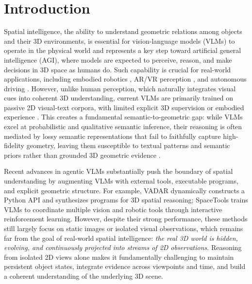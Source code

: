 \section{Introduction}
\label{sec:intro}
Spatial intelligence, the ability to understand geometric relations among objects and their 3D environments, is essential for vision-language models (VLMs) to operate in the physical world and represents a key step toward artificial general intelligence (AGI), where models are expected to perceive, reason, and make decisions in 3D space as humans do. 
% 
Such capability is crucial for real-world applications, including embodied robotics \citep{driess2023palme,brohan2023rt2}, AR/VR perception \citep{newcombe2011kinectfusion}, and autonomous driving \citep{geiger2012kitti,caesar2020nuscenes}. 
% 
However, unlike human perception, which naturally integrates visual cues into coherent 3D understanding, current VLMs are primarily trained on passive 2D visual-text corpora, with limited explicit 3D supervision or embodied experience \citep{radford2021clip,alayrac2022flamingo,liu2023llava}.
% 
This creates a fundamental semantic-to-geometric gap: while VLMs excel at probabilistic and qualitative semantic inference, their reasoning is often mediated by lossy semantic representations that fail to faithfully capture high-fidelity geometry, leaving them susceptible to textual patterns and semantic priors rather than grounded 3D geometric evidence \citep{gca,testset_stress}.


Recent advances in agentic VLMs substantially push the boundary of spatial understanding by augmenting VLMs with external tools, executable programs, and explicit geometric structure. 
% 
For example, VADAR \citep{vadar} dynamically constructs a Python API and synthesizes programs for 3D spatial reasoning; SpaceTools \citep{spacetools} trains VLMs to coordinate multiple vision and robotic tools through interactive reinforcement learning. %
% 
However, despite their strong performance, these methods still largely focus on static images or isolated visual observations, which remains far from the goal of real-world spatial intelligence: \textit{the real 3D world is hidden, evolving, and continuously projected into streams of 2D observations}. 
% 
Reasoning from isolated 2D views alone makes it fundamentally challenging to maintain persistent object states, integrate evidence across viewpoints and time, and build a coherent understanding of the underlying 3D scene.

